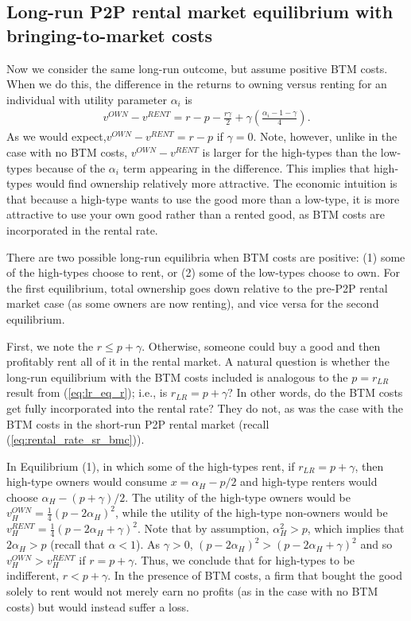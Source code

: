 \documentclass[11pt]{article}
\begin{document}
\subsection{Long-run P2P rental market equilibrium with bringing-to-market costs}
Now we consider the same long-run outcome, but assume positive BTM costs.
When we do this, the difference in the returns to owning versus renting for an individual with utility parameter $\alpha_i$  is 
\begin{align}
  v^{OWN} - v^{RENT} = r - p - \frac{r\gamma}{2} + \gamma \left( \frac{\alpha_i - 1 - \gamma}{4} \right). 
\end{align}
As we would expect,$v^{OWN} - v^{RENT} = r - p$ if $\gamma = 0$. 
Note, however, unlike in the case with no BTM costs, $v^{OWN} - v^{RENT}$ is larger for the high-types than the low-types because of the $\alpha_i$ term appearing in the difference.
This implies that high-types would find ownership relatively more attractive.
The economic intuition is that because a high-type wants to use the good more than a low-type, it is more attractive to use your own good rather than a rented good, as BTM costs are incorporated in the rental rate. 

There are two possible long-run equilibria when BTM costs are positive:
(1) some of the high-types choose to rent, or
(2) some of the low-types choose to own. 
For the first equilibrium, total ownership goes down relative to the pre-P2P rental market case (as some owners are now renting), and vice versa for the second equilibrium. 

First, we note the $r \le p + \gamma$.
Otherwise, someone could buy a good and then profitably rent all of it in the rental market.
A natural question is whether the long-run equilibrium with the BTM costs included is analogous to the $p = r_{LR}$ result from (\ref{eq:lr_eq_r}); i.e., is $r_{LR} = p + \gamma$? 
In other words, do the BTM costs get fully incorporated into the rental rate?
They do not, as was the case with the BTM costs in the short-run P2P rental market (recall (\ref{eq:rental_rate_sr_bmc})). 

In Equilibrium (1), in which some of the high-types rent, if $r_{LR} = p + \gamma$,  then high-type owners would consume $x = \alpha_H - p/2$ and high-type renters would choose $\alpha_H - (p + \gamma)/2$.
The utility of the high-type owners would be $v_H^{OWN} = \frac{1}{4}(p - 2\alpha_H)^2$, while the utility of the high-type non-owners would be $v_H^{RENT} = \frac{1}{4} \left(p - 2\alpha_H + \gamma \right)^2$.
Note that by assumption, $\alpha_H^2 > p$, which implies that $2 \alpha_H > p$ (recall that $\alpha < 1$).
As $\gamma > 0$, $(p - 2\alpha_H)^2 > (p - 2\alpha_H + \gamma)^2$ and so $v_H^{OWN} > v_H^{RENT}$ if $r = p + \gamma$.
Thus, we conclude that for high-types to be indifferent, $r < p + \gamma$.
In the presence of BTM costs, a firm that bought the good solely to rent would not merely earn no profits (as in the case with no BTM costs) but would instead suffer a loss. 
\end{document}
